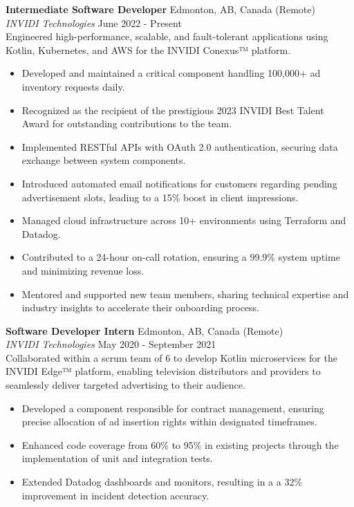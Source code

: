 \documentclass[a4paper]{article}
\begin{document}
\textbf{Intermediate Software Developer} \hfill Edmonton, AB, Canada (Remote)\\
\textit{INVIDI Technologies} \hfill June 2022 - Present \\
Engineered high-performance, scalable, and fault-tolerant applications using Kotlin, Kubernetes, and AWS for the INVIDI Conexus™ platform.
\vspace{-1mm}
\begin{itemize} \itemsep 1pt
    \item Developed and maintained a critical component handling 100,000+ ad inventory requests daily.
    \item Recognized as the recipient of the prestigious 2023 INVIDI Best Talent Award for outstanding contributions to the team.
    \item Implemented RESTful APIs with OAuth 2.0 authentication, securing data exchange between system components.
	\item Introduced automated email notifications for customers regarding pending advertisement slots, leading to a 15\% boost in client impressions.
    \item Managed cloud infrastructure across 10+ environments using Terraform and Datadog.
    \item Contributed to a 24-hour on-call rotation, ensuring a 99.9\% system uptime and minimizing revenue loss.
    \item Mentored and supported new team members, sharing technical expertise and industry insights to accelerate their onboarding process.
\end{itemize}
\vspace{1mm}

\textbf{Software Developer Intern} \hfill Edmonton, AB, Canada (Remote)\\
\textit{INVIDI Technologies} \hfill May 2020 - September 2021\\
Collaborated within a scrum team of 6 to develop Kotlin microservices for the INVIDI Edge™ platform, enabling television distributors and providers to seamlessly deliver targeted advertising to their audience.
\vspace{-1mm}
\begin{itemize} \itemsep 1pt
    \item Developed a component responsible for contract management, ensuring precise allocation of ad insertion rights within designated timeframes.
	\item Enhanced code coverage from 60\% to 95\% in existing projects through the implementation of unit and integration tests.
	\item Extended Datadog dashboards and monitors, resulting in a a 32\% improvement in incident detection accuracy.
\end{itemize}
\end{document}
